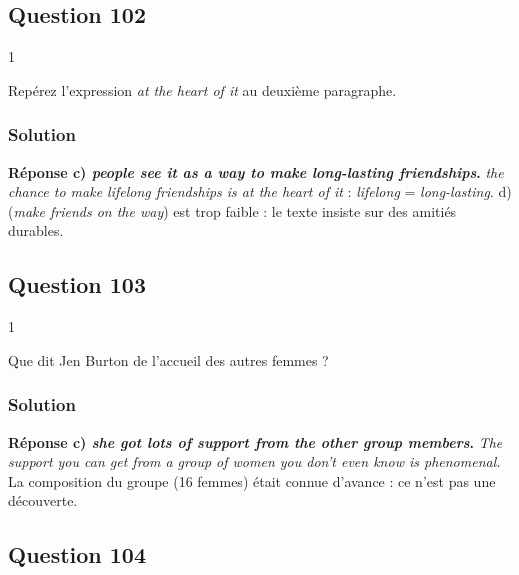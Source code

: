 \documentclass[11pt,a4paper]{article}
\begin{document}
\hypertarget{question-102}{%
\subsection{Question 102}\label{question-102}}

\begin{indication}{1}

Repérez l'expression \emph{at the heart of it} au deuxième paragraphe.

\end{indication}

\hypertarget{solution-101}{%
\subsubsection{Solution}\label{solution-101}}

\textbf{Réponse c) \emph{people see it as a way to make long-lasting friendships}.} \emph{the chance to make lifelong friendships is at the heart of it} : \emph{lifelong} = \emph{long-lasting}. d) (\emph{make friends on the way}) est trop faible : le texte insiste sur des amitiés durables.

\hypertarget{question-103}{%
\subsection{Question 103}\label{question-103}}

\begin{indication}{1}

Que dit Jen Burton de l'accueil des autres femmes ?

\end{indication}

\hypertarget{solution-102}{%
\subsubsection{Solution}\label{solution-102}}

\textbf{Réponse c) \emph{she got lots of support from the other group members}.} \emph{The support you can get from a group of women you don't even know is phenomenal.} La composition du groupe (16 femmes) était connue d'avance : ce n'est pas une découverte.

\hypertarget{question-104}{%
\subsection{Question 104}\label{question-104}}
\end{document}
